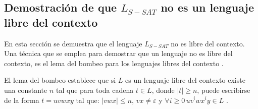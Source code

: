 \documentclass[12pt]{article}
\begin{document}
\subsection{Demostración de que $L_{S-SAT}$ no es un lenguaje libre del contexto}

En esta sección se demuestra que el lenguaje $L_{S-SAT}$ no es libre del contexto. Una técnica que se emplea para demostrar que un lenguaje no es libre del contexto, es el lema del bombeo para los lenguajes
libres del contexto \cite{authomataTheory}. 

El lema del bombeo establece que si $L$ es un lenguaje libre del contexto
existe una constante $n$ tal que para toda cadena $t\in L$, donde $|t|\geq n$, puede escribirse de la forma $t=uvwxy$ tal que:
$|vwx|\leq n$, $vx\neq \varepsilon$ y $\forall i\geq 0\,uv^iwx^iy\in L$ \cite{authomataTheory}.
\end{document}
